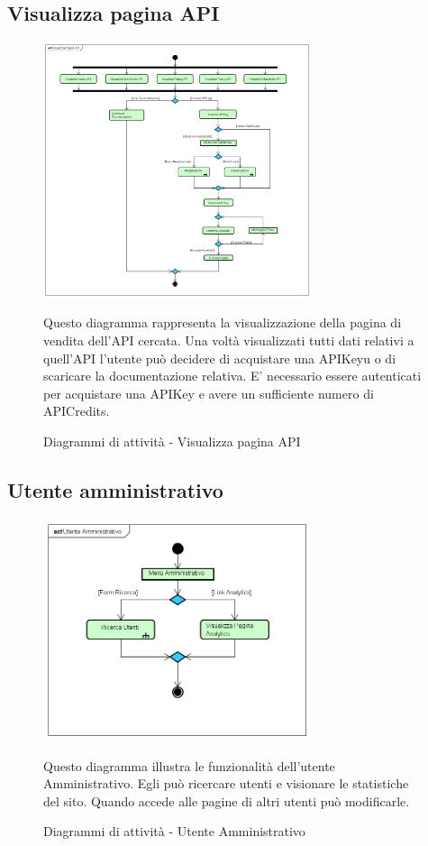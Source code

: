 {	\subsection{Visualizza pagina API}{
		\begin{figure}[ht]
			\centering
			\includegraphics[width=0.7\textwidth]{img/visualizzaPaginaApi}
			\caption{Diagrammi di attività - Visualizza pagina API}
			Questo diagramma rappresenta la visualizzazione della pagina di vendita dell'API cercata. Una voltà visualizzati tutti dati relativi a quell'API l'utente può decidere di acquistare una APIKeyu o di scaricare la documentazione relativa. E' necessario essere autenticati per acquistare una APIKey e avere un sufficiente numero di APICredits.  
		\end{figure}	
	}
	\subsection{Utente amministrativo}{
		\begin{figure}[ht]
			\centering
			\includegraphics[width=0.7\textwidth]{img/utenteAmministrativo}
			\caption{Diagrammi di attività - Utente Amministrativo}
			Questo diagramma illustra le funzionalità dell'utente Amministrativo. Egli può ricercare utenti e visionare le statistiche del sito. Quando accede alle pagine di altri utenti può modificarle. 
		\end{figure}	
	}
}